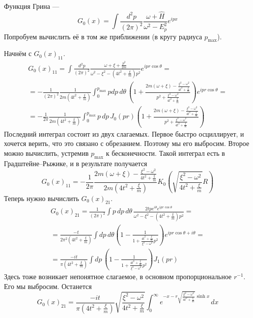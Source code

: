 \documentclass{article}
\begin{document}
Функция Грина --- 
\begin{equation}
    G_0(x) = \int \frac{d^2 p}{(2\pi)^2} 
            \frac{\omega + \hat{H}}{\omega^2 - E_p^2} e^{ipx}
\end{equation}
Попробуем вычислить её в том же приближении (в кругу радиуса $p_{\mathrm{max}}$). 

Начнём с $G_0(x)_{11}$. 
\begin{multline}
    G_0(x)_{11} = \int \frac{d^2 p}{(2\pi)^2} 
        \frac{\omega + \xi + \frac{p^2}{2m}}{\omega^2 - \xi^2 - (4t^2+\frac{\xi}{m})p^2}
            e^{ipr \cos{\theta}} = \\
    = -\frac{1}{(2\pi)^2} \frac{1}{2m (4t^2 + \frac{\xi}{m})}
        \int_0^{p_{\mathrm{max}}} pdp\,d\theta\,
        \left(1 + \frac{2m(\omega+\xi) - \frac{\xi^2 - \omega^2}{4t^2+\frac{\xi}{m}}}
                       {p^2 + \frac{\xi^2 - \omega^2}{4t^2 + \frac{\xi}{m}}}\right) 
                        e^{ipr \cos{\theta}} = \\
    = -\frac{1}{2\pi} \frac{1}{2m (4t^2 + \frac{\xi}{m})} 
        \int_0^{p_{\mathrm{max}}} p\,dp\,J_0(pr)
        \left(1 + \frac{2m(\omega+\xi) - \frac{\xi^2 - \omega^2}{4t^2+\frac{\xi}{m}}}
                       {p^2 + \frac{\xi^2 - \omega^2}{4t^2 + \frac{\xi}{m}}}\right) 
\end{multline}
Последний интеграл состоит из двух слагаемых. Первое быстро осциллирует, и хочется верить,
что это связано с обрезанием. Поэтому мы его выбросим. Второе можно вычислить, устремив 
$p_{\mathrm{max}}$ к бесконечности. Такой интеграл есть в Градштейне--Рыжике, и в 
результате получается
\begin{equation}
   G_0(x)_{11} = -\frac{1}{2\pi} 
            \frac{2m(\omega+\xi) - \frac{\xi^2 - \omega^2}{4t^2+\frac{\xi}{m}}}
            {2m (4t^2 + \frac{\xi}{m})} 
            K_0 \left(\sqrt{\frac{\xi^2 - \omega^2}{4t^2 + \frac{\xi}{m}}}R \right)
\end{equation}
Теперь нужно вычислить $G_0(x)_{21}$.
\begin{multline}
    G_0(x)_{21} = \frac{1}{(2\pi)^2}
                \int p\,dp\,d\theta\, \frac{2tpe^{i\theta} e^{ipr\cos{\theta}}}
                            {\omega^2 - \xi^2 - (4t^2+\frac{\xi}{m})p^2} = \\
                = \frac{-t}{2\pi^2(4t^2 + \frac{\xi}{m})}\int dp\,d\theta 
                    \left(1 - \frac{1}{1 + \frac{4t^2+\frac{\xi}{m}}{\xi^2 - \omega^2}p^2}
                    \right)
                    e^{ipr\cos{\theta} + i\theta} = \\
                =  \frac{-it}{\pi(4t^2 + \frac{\xi}{m})}\int dp\,
                    \left(1 - \frac{1}{1 + \frac{4t^2+\frac{\xi}{m}}{\xi^2 - \omega^2}p^2}
                    \right) J_1(pr)
\end{multline}
Здесь тоже возникает непонятное слагаемое, в основном пропорциональное $r^{-1}$. Его
мы выбросим. Останется
\begin{equation}
   G_0(x)_{21} = \frac{-it}{\pi(4t^2 + \frac{\xi}{m})}
                \sqrt{\frac{\xi^2 - \omega^2}{4t^2+\frac{\xi}{m}}}
                   \int_0^{\infty} e^{-x - r\sqrt{\frac{\xi^2 - \omega^2}{4t^2+\frac{\xi}{m}}}
                            \sinh{x}} \,dx
\end{equation}
\end{document}
